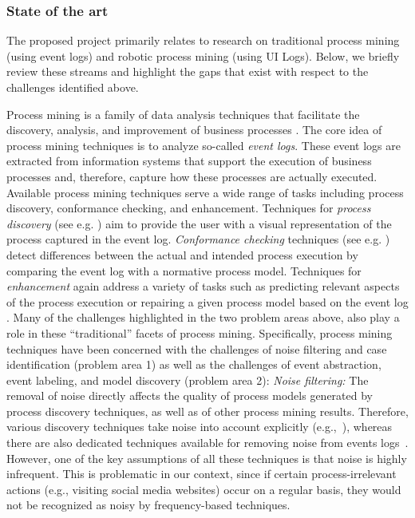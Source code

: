  
\subsubsection{State of the art} 
 \label{sec:stateoftheart}
 
The proposed project primarily relates to research on traditional process mining (using event logs) and robotic process mining (using UI Logs). Below, we briefly review these streams and highlight the gaps that exist with respect to the challenges identified above.  

 Process mining is a family of data analysis techniques that facilitate the discovery, analysis, and improvement of business processes \cite{van2016data}. The core idea of process mining techniques is to analyze so-called \textit{event logs}. These event logs are extracted from information systems that support the execution of business processes and, therefore, capture how these processes are actually executed. Available process mining techniques serve a wide range of tasks including process discovery, conformance checking, and enhancement. Techniques for \textit{process discovery} (see e.g. \cite{gunther2007fuzzy,weijters2011flexible,leemans2013discovering}) aim to provide the user with a visual representation of the process captured in the event log. \textit{Conformance checking} techniques (see e.g. \cite{rozinat2008conformance,adriansyah2011conformance}) detect differences between the actual and intended process execution by comparing the event log with a normative process model. Techniques for \textit{enhancement} again address a variety of tasks such as predicting relevant aspects of the process execution \cite{di2018predictive} or repairing a given process model based on the event log \cite{polyvyanyy2016impact}. Many of the challenges highlighted in the two problem areas above, also play a role in these ``traditional'' facets of process mining. Specifically, process mining techniques have been concerned with the challenges of noise filtering and case identification (problem area 1) as well as the challenges of event abstraction, event labeling, and model discovery (problem area 2):
\vspace{0.2em}
\newline%
\noindent \textit{Noise filtering:} The removal of noise directly affects the quality of process models generated by process discovery techniques, as well as of other process mining results. 
Therefore, various discovery techniques take noise into account explicitly (e.g.,~\cite{weijters2003rediscovering,leemans2013discovering,van2016avoiding}), whereas there are also dedicated techniques available  for removing noise from events logs~\cite{tax2017discovering,CHENG2015138}. However, one of the key assumptions of all these techniques is that noise is highly infrequent. This is problematic in our context, since if certain process-irrelevant actions (e.g., visiting social media websites) occur on a regular basis, they would not be recognized as noisy by frequency-based techniques. 

